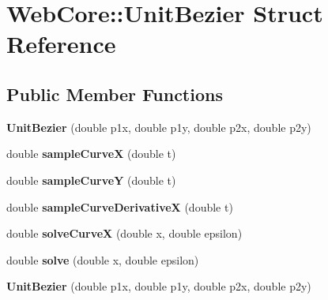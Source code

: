 \hypertarget{struct_web_core_1_1_unit_bezier}{}\section{Web\+Core\+:\+:Unit\+Bezier Struct Reference}
\label{struct_web_core_1_1_unit_bezier}
\subsection*{Public Member Functions}
\begin{DoxyCompactItemize}
\item 
\mbox{\label{struct_web_core_1_1_unit_bezier_a0d1e646f7bc9d9cd95617cc70052a949}} 
{\bfseries Unit\+Bezier} (double p1x, double p1y, double p2x, double p2y)
\item 
\mbox{\label{struct_web_core_1_1_unit_bezier_a2ac0ad0bb8a06668f0bc63a3b7e2146d}} 
double {\bfseries sample\+CurveX} (double t)
\item 
\mbox{\label{struct_web_core_1_1_unit_bezier_a85a17efada3e5a7c51c862d4385dd1d1}} 
double {\bfseries sample\+CurveY} (double t)
\item 
\mbox{\label{struct_web_core_1_1_unit_bezier_aad9b7d2275089d53014ac0773fc51d47}} 
double {\bfseries sample\+Curve\+DerivativeX} (double t)
\item 
\mbox{\label{struct_web_core_1_1_unit_bezier_ae1499ee43da030757b7656e1ef737dd4}} 
double {\bfseries solve\+CurveX} (double x, double epsilon)
\item 
\mbox{\label{struct_web_core_1_1_unit_bezier_a413cc705e81db83326cb67ac4093af4c}} 
double {\bfseries solve} (double x, double epsilon)
\item 
\mbox{\label{struct_web_core_1_1_unit_bezier_a0d1e646f7bc9d9cd95617cc70052a949}} 
{\bfseries Unit\+Bezier} (double p1x, double p1y, double p2x, double p2y)
\item 
\mbox{\label{struct_web_core_1_1_unit_bezier_a2ac0ad0bb8a06668f0bc63a3b7e2146d}} 

\end{DoxyCompactItemize}
